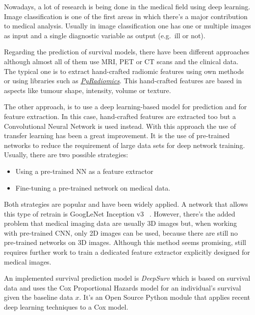 Nowadays, a lot of research is being done in the medical field using deep learning. Image
classification is one of the first areas in which there's a major contribution to medical analysis.
Usually in image classification one has one or multiple images as input and a single diagnostic 
variable as output (e.g.~ill or not).
~\cite{medical:survey-deep-learning}

Regarding the prediction of survival models, there have been different approaches although
almost all of them use MRI, PET or CT scans and the clinical data. The typical one is to extract
hand-crafted radiomic features using own methods or using libraries such as
\href{https://github.com/Radiomics/pyradiomics}{\emph{PyRadiomics}}. This hand-crafted 
features are based in aspects like tumour shape, intensity, volume or texture.
~\cites{medical:tumour-radiomics}{medical:py-radiomics}

The other approach, is to use a deep learning-based model for prediction and for feature
extraction. In this case, hand-crafted features are extracted too but a Convolutional
Neural Network is used instead. With this approach the use of transfer learning has been a
great improvement. It is the use of pre-trained networks to reduce the requirement of large data
sets for deep network training. Usually, there are two possible strategies: 
\begin{itemize}[noitemsep, topsep=0pt]
  \item Using a pre-trained NN as a feature extractor
  \item Fine-tuning a pre-trained network on medical data.
\end{itemize}

Both strategies are popular and have been widely applied. A network that allows this type
of retrain is GoogLeNet Inception v3
~\cites{neural:goog-le-net}{neural:retrain}{neural:inception-retrain}.
However, there's the added problem that medical imaging data are usually 3D images but, 
when working with pre-trained CNN, only 2D images can be used, because there are still no 
pre-trained networks on 3D images. Although this method seems promising, still requires 
further work to train a dedicated feature extractor explicitly designed for medical images.
~\cite{medical:deep-learning-radiomics-gbm}

An implemented survival prediction model is \emph{DeepSurv} which is based on survival data
and uses the Cox Proportional Hazards model for an individual's survival given the baseline data
\( x \). It's an Open Source Python module that applies recent deep learning techniques 
to a Cox model.
~\cites{medical:deep-surv}{medical:cox}

